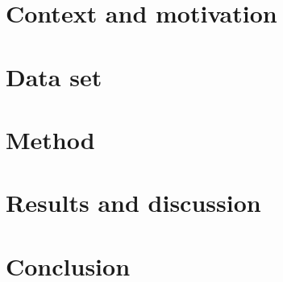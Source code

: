 \documentclass[11pt]{article}
\begin{document}

\pagebreak{}


\tableofcontents
{}
\setcounter{page}{2}
\pagebreak{}

\listoffigures
\listoftables
\pagebreak{}


\setcounter{page}{1}


\section{Context and motivation}



\section{Data set}



\section{Method}



\section{Results and discussion}


\newpage
\section{Conclusion}



\newpage




\end{document}
